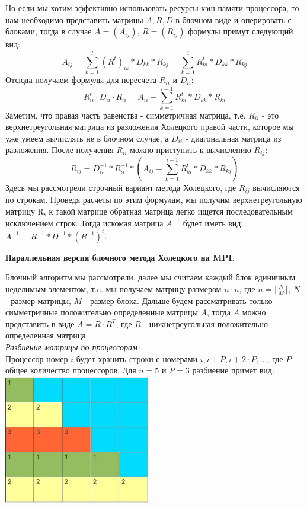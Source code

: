 \documentclass[12pt,a4paper]{article}
\begin{document}
\indent Но если мы хотим эффективно использовать ресурсы кэш памяти процессора, то нам необходимо представить матрицы $A, R, D$ в блочном виде и оперировать с блоками, тогда в случае $A = (A_{i j})$, $R = (R_{i j})$ формулы примут следующий вид:
$$ A_{i j} = \sum_{k = 1}^{l} {(R^{t})_{i k} * D_{k k} * R_{k j}} = 
\sum_{k = 1}^{i} {R^{t}_{k i} * D_{k k} * R_{k j}} $$  
Отсюда получаем формулы для пересчета $R_{i i}$ и $D_{i i}$:
$$R^t_{i i} \cdot D_{i i} \cdot R_{i i} = A_{i i} - \sum_{k=1}^{i-1} R_{k i}^t * D_{k k} * R_{k i} $$
\indent Заметим, что правая часть равенства - симметричная матрица, т.е. $R_{i i}$ - это верхнетреугольная матрица из разложения Холецкого правой части, которое мы уже умеем вычислять не в блочном случае, а $D_{i i}$ - диагональная матрица из разложения. После получения $ R_{i i} $ можно приступить к вычислению $R_{i j}$:
$$R_{i j} = D_{i i}^{-1} * R_{i i}^{-1}*(A_{i j} - \sum_{k=1}^{i-1} R_{k i}^t * D_{k k} * R_{k j}) $$
\indent Здесь мы рассмотрели строчный вариант метода Холецкого, где $R_{i j}$ вычисляются по строкам. Проведя расчеты по этим формулам, мы получим верхнетреугольную матрицу R, к такой матрице обратная матрица легко ищется последовательным исключением строк. Тогда искомая матрица $ A^{-1} $ будет иметь вид: $A^{-1} = R^{-1} * D^{-1} * ({R^{-1}})^t$.
\\
\begin{center}
\textbf{Параллельная версия блочного метода Холецкого на MPI.}
\end{center}
Блочный алгоритм мы рассмотрели, далее мы считаем каждый блок единичным неделимым элементом, т.e. мы получаем матрицу размером $n \cdot n$, где $n = \lceil \frac{N}{M} \rceil$, $N$ - размер матрицы, $M$ - размер блока. Дальше будем рассматривать только симметричные положительно определенные матрицы $A$, тогда $A$ можно представить в виде $A = R \cdot R^{T}$, где $R$ - нижнетреугольная положительно определенная матрица.
\\
\indent \textit{Разбиение матрицы по процессорам:}
\\
Процессор номер $i$ будет хранить строки с номерами 
$i, i + P, i + 2 \cdot P, ...$, где $P$ - общее количество процессоров.
Для $n=5$ и $P=3$ разбиение примет вид:
\\
\includegraphics[width=64mm]{img0.jpg}
\end{document}

